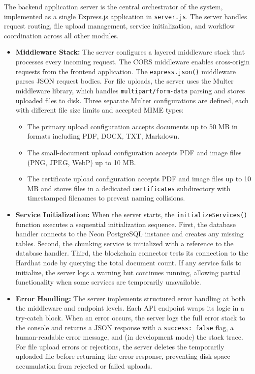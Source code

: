 The backend application server is the central orchestrator of the system, implemented as a single Express.js application in \texttt{server.js}. The server handles request routing, file upload management, service initialization, and workflow coordination across all other modules.
\begin{itemize}
\item \textbf{Middleware Stack:} The server configures a layered middleware stack that processes every incoming request. The CORS middleware enables cross-origin requests from the frontend application. The \texttt{express.json()} middleware parses JSON request bodies. For file uploads, the server uses the Multer middleware library, which handles \texttt{multipart/form-data} parsing and stores uploaded files to disk. Three separate Multer configurations are defined, each with different file size limits and accepted MIME types:

\begin{itemize}
    \item The primary upload configuration accepts documents up to 50 MB in formats including PDF, DOCX, TXT,  Markdown.
    \item The small-document upload configuration accepts PDF and image files (PNG, JPEG, WebP) up to 10 MB.
    \item The certificate upload configuration accepts PDF and image files up to 10 MB and stores files in a dedicated \texttt{certificates} subdirectory with timestamped filenames to prevent naming collisions.
\end{itemize}

\item \textbf{Service Initialization:} When the server starts, the \texttt{initializeServices()} function executes a sequential initialization sequence. First, the database handler connects to the Neon PostgreSQL instance and creates any missing tables. Second, the chunking service is initialized with a reference to the database handler. Third, the blockchain connector tests its connection to the Hardhat node by querying the total document count. If any service fails to initialize, the server logs a warning but continues running, allowing partial functionality when some services are temporarily unavailable.

\item \textbf{Error Handling:} The server implements structured error handling at both the middleware and endpoint levels. Each API endpoint wraps its logic in a try-catch block. When an error occurs, the server logs the full error stack to the console and returns a JSON response with a \texttt{success: false} flag, a human-readable error message, and (in development mode) the stack trace. For file upload errors or rejections, the server deletes the temporarily uploaded file before returning the error response, preventing disk space accumulation from rejected or failed uploads.
\end{itemize}

